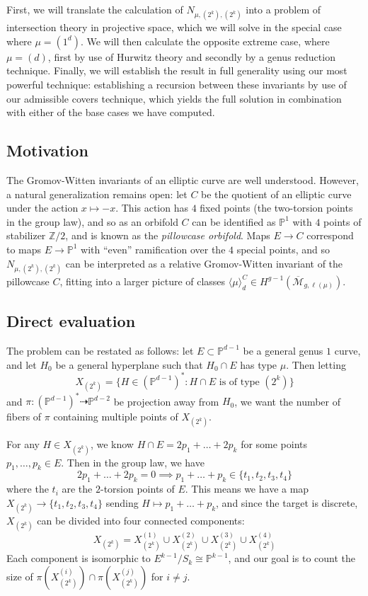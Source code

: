 \documentclass[11pt]{article}           %
\newcommand{\Z}{\ensuremath{\mathbb{Z}}}
\renewcommand{\P}{\mathbb P}
\theoremstyle{definition}
\begin{document}
First, we will translate the calculation of $N_{\mu,(2^k),(2^k)}$ into a problem of intersection theory
in projective space, which we will solve in the special case where $\mu=(1^d)$.
We will then calculate the opposite extreme case, where $\mu=(d)$, first by use of Hurwitz theory and
secondly by a genus reduction technique. Finally, we will establish the result in full generality using
our most powerful technique: establishing a recursion between these invariants by use of
our admissible covers technique, which yields the full solution in combination with either of the base
cases we have computed.

\subsection{Motivation}

The Gromov-Witten invariants of an elliptic curve are well understood. However, a natural generalization
remains open: let $C$ be the quotient of an elliptic curve under the action $x\mapsto -x$.
This action has $4$ fixed points (the two-torsion points in the group law), and so as an orbifold
$C$ can be identified as $\P^1$ with $4$ points of stabilizer $\Z/2$, and is known as the
{\it pillowcase orbifold}. Maps $E\to C$ correspond to maps $E\to\P^1$ with ``even'' ramification over
the $4$ special points, and so $N_{\mu,(2^k),(2^k)}$ can be interpreted as a relative Gromov-Witten
invariant of the pillowcase $C$, fitting into a larger picture of classes $\langle \mu\rangle_d^{C}\in H^{g-1}(\overline{\mathcal M}_{g,\ell(\mu)})$.

\subsection{Direct evaluation}
\label{section:direct2}

The problem can be restated as follows: let $E\subset \P^{d-1}$ be a general genus $1$ curve,
and let $H_0$ be a general hyperplane such that $H_0\cap E$ has type $\mu$. Then letting \[X_{(2^k)}=\{H\in(\P^{d-1})^*:H\cap E\text{ is of type }(2^k)\}\]
and $\pi:(\P^{d-1})^*\dashrightarrow \P^{d-2}$ be projection away from $H_0$, we want the number of fibers of $\pi$
containing multiple points of $X_{(2^k)}$.

For any $H\in X_{(2^k)}$, we know $H\cap E=2p_1+\dots+2p_k$ for some points $p_1,\dots,p_k\in E$. Then in the group law, we have
\[
2p_1+\dots+2p_k=0\implies p_1+\dots+p_k\in\{t_1,t_2,t_3,t_4\}
\]
where the $t_i$ are the $2$-torsion points of $E$. This means we have a map $X_{(2^k)}\to\{t_1,t_2,t_3,t_4\}$ sending $H\mapsto p_1+\dots+p_k$, and since the target is discrete, $X_{(2^k)}$ can be divided into four connected components:
\[
X_{(2^k)}=X_{(2^k)}^{(1)}\cup X_{(2^k)}^{(2)}\cup X_{(2^k)}^{(3)}\cup X_{(2^k)}^{(4)}
\]
Each component is isomorphic to $E^{k-1}/S_k\cong \P^{k-1}$,
and our goal is to count the size of $\pi(X_{(2^k)}^{(i)})\cap \pi(X_{(2^k)}^{(j)})$
for $i\neq j$.
\end{document}
